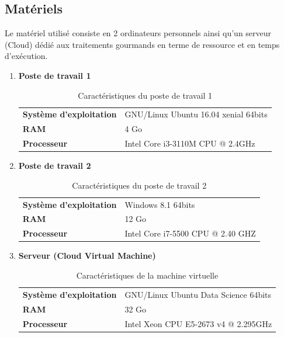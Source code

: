 \subsection{Matériels}
Le matériel utilisé consiste en 2 ordinateurs personnels ainsi qu'un serveur (Cloud) dédié aux traitements gourmands en terme de ressource et en temps d'exécution.
\begin{enumerate}
    \item{\textbf{Poste de travail 1}}
    \begin{table}[h!]
        \begin{center}
            \begin{tabular}{|C{5cm}|C{8cm}|}
                \hline
                \textbf{Système d'exploitation} &  GNU/Linux Ubuntu 16.04 xenial 64bits \\
                \textbf{RAM} &  4 Go \\
                \textbf{Processeur} & Intel Core i3-3110M CPU @ 2.4GHz \\
                \hline
            \end{tabular}
        \end{center}
        \caption{Caractéristiques du poste de travail 1}
    \end{table}
    
    \item{\textbf{Poste de travail 2}}
    \begin{table}[h!]
        \begin{center}
            \begin{tabular}{|C{5cm}|C{8cm}|}
                \hline
                \textbf{Système d'exploitation} &  Windows 8.1 64bits \\
                \textbf{RAM} &  12 Go \\
                \textbf{Processeur} & Intel Core i7-5500 CPU @ 2.40 GHZ \\
                \hline
            \end{tabular}
        \end{center}
        \caption{Caractéristiques du poste de travail 2}
    \end{table}
    
    \item{\textbf{Serveur (Cloud Virtual Machine)}}
    \begin{table}[h!]
        \begin{center}
            \begin{tabular}{|C{5cm}|C{8cm}|}
                \hline
                \textbf{Système d'exploitation} &  GNU/Linux Ubuntu Data Science 64bits \\
                \textbf{RAM} &  32 Go \\
                \textbf{Processeur} & Intel Xeon CPU E5-2673 v4 @ 2.295GHz \\
                \hline
            \end{tabular}
        \end{center}
        \caption{Caractéristiques de la machine virtuelle}
    \end{table}
\end{enumerate}   

